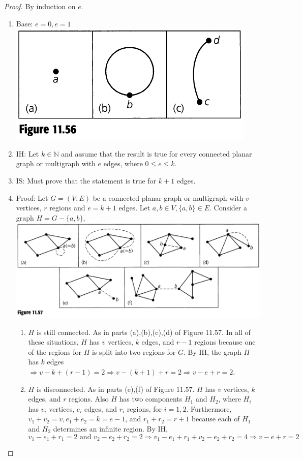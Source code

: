 \documentclass[letter]{book}
\theoremstyle{definition}
\theoremstyle{definition}
\theoremstyle{remark}
\begin{document}
\begin{proof} By induction on $e$.
    \begin{enumerate}
        \item Base: $e=0,e=1$\\
        \includegraphics[scale=0.5]{"Figure11-56"}
        \item IH: Let $k\in \mathbb{N}$ and assume that the result is true for every connected planar graph or multigraph with $e$ edges, where $0\leq e\leq k$.
        \item IS: Must prove that the statement is true for $k+1$ edges.
        \item Proof: Let $G=(V,E)$ be a connected planar graph or multigraph with $v$ vertices, $r$ regions and $e=k+1$ edges. Let $a,b\in V, \{a,b\}\in E$. Consider a graph $H=G-\{a,b\}$,\\
        \includegraphics[scale=0.5]{"Figure11-57"}
        \begin{enumerate}
            \item $H$ is still connected. As in parts (a),(b),(c),(d) of Figure 11.57. In all of these situations, $H$ has $v$ vertices, $k$ edges, and $r-1$ regions because one of the regions for $H$ is split into two regions for $G$. By IH, the graph $H$ has $k$ edges $\Rightarrow v-k+(r-1)=2\Rightarrow v-(k+1)+r=2\Rightarrow v-e+r=2$.
            \item $H$ is disconnected. As in parts (e),(f) of Figure 11.57. $H$ has $v$ vertices, $k$ edges, and $r$ regions. Also $H$ has two components $H_1$ and $H_2$, where $H_i$ has $v_i$ vertices, $e_i$ edges, and $r_i$ regions, for $i=1,2$. Furthermore, $v_1+v_2=v,e_1+e_2=k=e-1$, and $r_1+r_2=r+1$ because each of $H_1$ and $H_2$ determines an infinite region. By IH,
            \begin{equation*}
                v_1-e_1+r_1=2\text{ and }v_2-e_2+r_2=2\Rightarrow v_1-e_1+r_1+v_2-e_2+r_2=4\Rightarrow v-e+r=2
            \end{equation*}
        \end{enumerate}
    \end{enumerate}
\end{proof}
\end{document}
